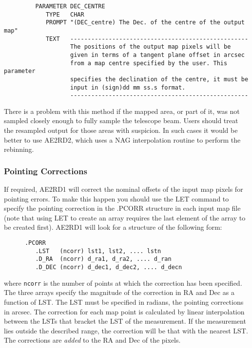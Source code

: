 \begin{small}
\begin{verbatim}
         PARAMETER DEC_CENTRE
            TYPE   CHAR
            PROMPT "(DEC_centre) The Dec. of the centre of the output map"
            TEXT   ---------------------------------------------------
                   The positions of the output map pixels will be 
                   given in terms of a tangent plane offset in arcsec 
                   from a map centre specified by the user. This parameter
                   specifies the declination of the centre, it must be 
                   input in (sign)dd mm ss.s format.
                   ---------------------------------------------------
\end{verbatim}
\end{small}

There is a problem with this method if the mapped area, or part of it,
was not sampled closely enough to fully sample the telescope beam.
Users should treat the resampled output for those  areas with
suspicion. In such cases it would be better to use AE2RD2, which uses
a NAG interpolation routine to perform the rebinning.


\subsubsection {Pointing Corrections}

If required, AE2RD1 will correct the nominal offsets of the  input map
pixels for pointing errors. To make this happen you should use the LET
command to specify the pointing correction in the .PCORR structure in
each input map file (note that using LET to create an array requires
the last element of the array to be created first). AE2RD1 will look
for a structure of the following form:

\begin{small}
\begin{verbatim}
      .PCORR
         .LST   (ncorr) lst1, lst2, .... lstn
         .D_RA  (ncorr) d_ra1, d_ra2, .... d_ran
         .D_DEC (ncorr) d_dec1, d_dec2, .... d_decn
\end{verbatim}
\end{small}

where \verb+ncorr+ is the number of points at which the correction has
been specified. The three arrays specify the magnitude of the
correction in RA and Dec as a function of LST. The LST must be
specified in radians, the pointing corrections in arcsec. The
correction for each map point is calculated by linear interpolation
between the LSTs that bracket the LST of the measurement. If the
measurement lies outside the described  range, the correction will be
that with the nearest LST. The corrections are {\em added} to the RA
and Dec of the pixels.

